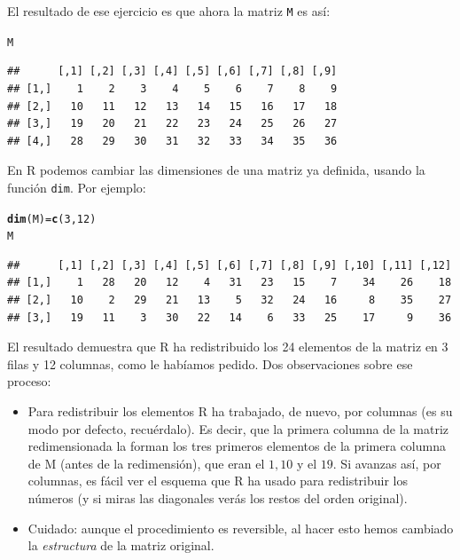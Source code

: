 \documentclass[10pt,a4paper]{article}\usepackage[]{graphicx}\usepackage[]{color}
\makeatletter
\newcommand{\hlnum}[1]{\textcolor[rgb]{0.686,0.059,0.569}{#1}}%
\newcommand{\hlstd}[1]{\textcolor[rgb]{0.345,0.345,0.345}{#1}}%
\newcommand{\hlkwb}[1]{\textcolor[rgb]{0.69,0.353,0.396}{#1}}%
\newcommand{\hlkwd}[1]{\textcolor[rgb]{0.737,0.353,0.396}{\textbf{#1}}}%
\newenvironment{kframe}{%
 \def\at@end@of@kframe{}%
 \ifinner\ifhmode%
  \def\at@end@of@kframe{\end{minipage}}%
  \begin{minipage}{\columnwidth}%
 \fi\fi%
 \def\FrameCommand##1{\hskip\@totalleftmargin \hskip-\fboxsep
 \colorbox{shadecolor}{##1}\hskip-\fboxsep
     \hskip-\linewidth \hskip-\@totalleftmargin \hskip\columnwidth}%
 \MakeFramed {\advance\hsize-\width
   \@totalleftmargin\z@ \linewidth\hsize
   \@setminipage}}%
 {\par\unskip\endMakeFramed%
 \at@end@of@kframe}
\newenvironment{knitrout}{}{} %
\makeatother
\begin{document}
El resultado de ese ejercicio es que ahora la matriz {\tt M} es así:
\begin{knitrout}
\color{fgcolor}\begin{kframe}
\begin{alltt}
\hlstd{M}
\end{alltt}
\begin{verbatim}
##      [,1] [,2] [,3] [,4] [,5] [,6] [,7] [,8] [,9]
## [1,]    1    2    3    4    5    6    7    8    9
## [2,]   10   11   12   13   14   15   16   17   18
## [3,]   19   20   21   22   23   24   25   26   27
## [4,]   28   29   30   31   32   33   34   35   36
\end{verbatim}
\end{kframe}
\end{knitrout}
     En R podemos cambiar las dimensiones de una matriz ya definida, usando la función {\tt dim}. Por ejemplo:
\begin{knitrout}
\color{fgcolor}\begin{kframe}
\begin{alltt}
\hlkwd{dim}\hlstd{(M)}\hlkwb{=}\hlkwd{c}\hlstd{(}\hlnum{3}\hlstd{,}\hlnum{12}\hlstd{)}
\hlstd{M}
\end{alltt}
\begin{verbatim}
##      [,1] [,2] [,3] [,4] [,5] [,6] [,7] [,8] [,9] [,10] [,11] [,12]
## [1,]    1   28   20   12    4   31   23   15    7    34    26    18
## [2,]   10    2   29   21   13    5   32   24   16     8    35    27
## [3,]   19   11    3   30   22   14    6   33   25    17     9    36
\end{verbatim}
\end{kframe}
\end{knitrout}
     El resultado demuestra que R ha redistribuido los 24 elementos de la matriz en 3 filas y 12 columnas, como le habíamos pedido. Dos observaciones sobre ese proceso:
     \begin{itemize}
\item Para redistribuir los elementos R ha trabajado, de nuevo, por columnas (es su modo por defecto, recuérdalo). Es decir, que la primera columna de la matriz redimensionada la forman los tres primeros elementos de la primera columna de M (antes de la redimensión), que eran el $1, 10$ y el $19$. Si avanzas así, por columnas, es fácil ver el esquema que R ha usado para redistribuir los números (y si miras las diagonales verás los restos del orden original).
\item Cuidado: aunque el procedimiento es reversible, al hacer esto hemos cambiado la {\em estructura} de la matriz original.
\end{itemize}
\end{document}
